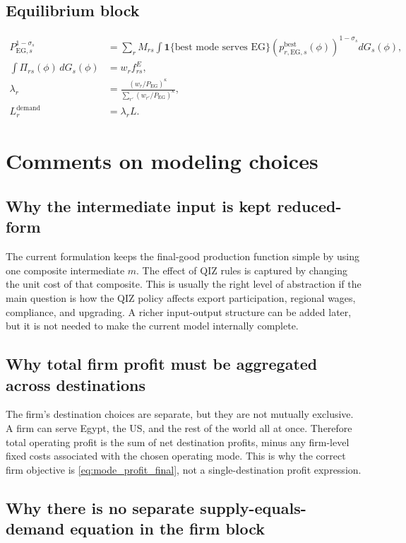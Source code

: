 \documentclass[11pt]{article}
\begin{document}
\subsection*{Equilibrium block}
\begin{align}
P_{\mathrm{EG},s}^{1-\sigma_s}&=\sum_r M_{rs}\int \mathbf{1}\{\text{best mode serves EG}\}\left(p_{r,\mathrm{EG},s}^{\mathrm{best}}(\phi)\right)^{1-\sigma_s}dG_s(\phi),\\
\int \Pi_{rs}(\phi)\,dG_s(\phi)&=w_rf^E_{rs},\\
\lambda_r&=\frac{(w_r/P_{\mathrm{EG}})^\kappa}{\sum_{r'}(w_{r'}/P_{\mathrm{EG}})^\kappa},\\
L_r^{\mathrm{demand}}&=\lambda_r L.
\end{align}

\section{Comments on modeling choices}

\subsection{Why the intermediate input is kept reduced-form}

The current formulation keeps the final-good production function simple by using one composite intermediate \(m\). The effect of QIZ rules is captured by changing the unit cost of that composite. This is usually the right level of abstraction if the main question is how the QIZ policy affects export participation, regional wages, compliance, and upgrading. A richer input-output structure can be added later, but it is not needed to make the current model internally complete.

\subsection{Why total firm profit must be aggregated across destinations}

The firm's destination choices are separate, but they are not mutually exclusive. A firm can serve Egypt, the US, and the rest of the world all at once. Therefore total operating profit is the sum of net destination profits, minus any firm-level fixed costs associated with the chosen operating mode. This is why the correct firm objective is \eqref{eq:mode_profit_final}, not a single-destination profit expression.

\subsection{Why there is no separate supply-equals-demand equation in the firm block}
\end{document}
